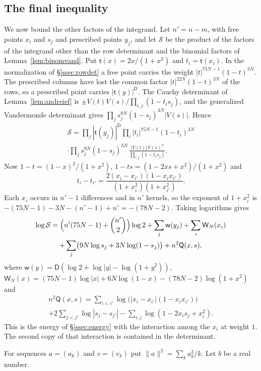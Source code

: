 \documentclass[11pt]{amsart}
\theoremstyle{definition}
\theoremstyle{remark}
\numberwithin{equation}{section}
\begin{document}
\subsection{The final inequality}\label{ssec:budget}
We now bound the other factors of the integrand. Let $n'=n-m$, with free points $x_i$ and $s_j$ and prescribed points $y_j$, and let $\mathcal S$ be the product of the
factors of the integrand other than the row determinant and the binomial factors of Lemma~\ref{lem:binomvand}. Put $\mathsf t(x)=2x/(1+x^2)$ and $t_i=\mathsf t(x_i)$. In the normalization of
\S\ref{ssec:rowdet} a free point carries the weight $|t|^{75N-1}(1-t)^{3N}$. The prescribed columns have lost the common factor $|t|^{22N}(1-t)^{3N}$ of the rows, so a prescribed point
carries $|\mathsf t(y)|^{\mathsf D}$. The Cauchy determinant of Lemma~\ref{lem:andreief} is $\pm V(t)V(s)/\prod_{i,j}(1-t_is_j)$, and the generalized Vandermonde determinant gives
$\prod_js_j^{9N}(1-s_j)^{3N}|V(s)|$. Hence
\begin{multline*}
 \mathcal S=\prod_j|\mathsf t(y_j)|^{\mathsf D}\prod_i|t_i|^{75N-1}(1-t_i)^{3N}\\
 \cdot\prod_js_j^{9N}(1-s_j)^{3N}\,\frac{|V(t)|\,V(s)^2}{\prod_{i,j}(1-t_is_j)}.
\end{multline*}
Now $1-t=(1-x)^2/(1+x^2)$, $1-ts=(1-2xs+x^2)/(1+x^2)$ and
\[
 t_i-t_{i'}=\frac{2(x_i-x_{i'})(1-x_ix_{i'})}{(1+x_i^2)(1+x_{i'}^2)}.
\]
Each $x_i$ occurs in $n'-1$ differences and in $n'$ kernels, so the exponent of $1+x_i^2$ is $-(75N-1)-3N-(n'-1)+n'=-(78N-2)$. Taking logarithms gives
\begin{multline}\label{eq:scalar}
 \log\mathcal S=\Bigl(n'(75N-1)+\binom{n'}2\Bigr)\log2+\sum_j\mathsf w(y_j)+\sum_i\mathsf W_N(x_i)\\
 +\sum_j\bigl(9N\log s_j+3N\log(1-s_j)\bigr)+n^2\mathsf Q(x,s),
\end{multline}
where $\mathsf w(y)=\mathsf D(\log2+\log|y|-\log(1+y^2))$, $\mathsf W_N(x)=(75N-1)\log|x|+6N\log(1-x)-(78N-2)\log(1+x^2)$ and
\begin{multline*}
 n^2\mathsf Q(x,s)=\sum_{i<i'}\log\bigl(|x_i-x_{i'}|(1-x_ix_{i'})\bigr)\\
 +2\sum_{j<j'}\log|s_j-s_{j'}|-\sum_{i,j}\log(1-2x_is_j+x_i^2).
\end{multline*}
This is the energy of \S\ref{ssec:energy} with the interaction among the $x_i$ at weight $1$. The second copy of that interaction is
contained in the determinant.

For sequences $a=(a_k)$ and $v=(v_k)$ put $\|a\|^2=\sum_ka_k^2/k$. Let $b$ be a real number.
\end{document}
